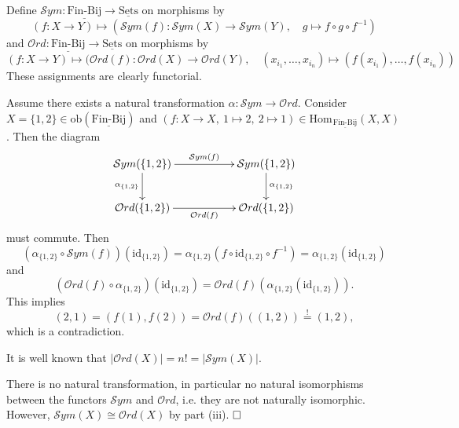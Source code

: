 \documentclass[11pt]{book}
\numberwithin{dummy}{section}
\theoremstyle{nonumberbreak}
\newenvironment{sol}[1][]{\ifthenelse{\equal{#1}{}}{\solution}{\solution[#1]}\rm}{\endsolution}
\newenvironment{prob}[1][]{\ifthenelse{\equal{#1}{}}{\problem}{\problem[#1]}\rm}{\endproblem}
\newcommand{\Hom}{\mathrm{Hom}\hspace{1pt}}
\newcommand{\sets}{\underline{\mathrm{Sets}}}
\newcommand{\finbij}{\underline{\mathrm{Fin}\textrm{-}\mathrm{Bij}}}
\newcommand{\la}{\longrightarrow}
\newcommand{\id}{\mathrm{id}}
\begin{document}
\begin{spacing}{1.4}
\begin{prob}
\begin{sol}
\begin{compactenum}
\item Define $\mathcal{S}ym: \finbij \la \sets$ on morphisms by
$$(f: X \la Y) \mapsto (\mathcal{S}ym(f): \mathcal{S}ym(X) \la \mathcal{S}ym(Y), \quad g \mapsto f \circ g \circ f^{-1})$$
and $\mathcal{O}rd: \finbij \la \sets$ on morphisms by 
$$(f: X \la Y) \mapsto (\mathcal{O}rd(f): \mathcal{O}rd(X) \la \mathcal{O}rd(Y), \quad (x_{i_1}, \ldots, x_{i_n}) \mapsto \left(f(x_{i_1}), \ldots, f(x_{i_n})\right) $$
These assignments are clearly functorial. 

\item Assume there exists a natural transformation $\alpha: \mathcal{S}ym \la \mathcal{O}rd$. Consider $X=\{1,2\} \in \mathrm{ob}(\finbij)$ and $(f: X \la X, \ 1 \mapsto 2, \ 2 \mapsto 1) \in \Hom_{\finbij}(X,X)$. Then the diagram
$$
\begin{xy}
\xymatrix{
\mathcal{S}ym(\{1,2\}) \ar[rr]^{\mathcal{S}ym(f)} \ar[d]_{\alpha_{\{1,2\}}} && \mathcal{S}ym(\{1,2\}) \ar[d]^{\alpha_{\{1,2\}}} \\ \mathcal{O}rd(\{1,2\}) \ar[rr]_{\mathcal{O}rd(f)} && \mathcal{O}rd(\{1,2\})
}
\end{xy}
$$
must commute. Then 
$$\left( \alpha_{\{1,2\}} \circ \mathcal{S}ym(f)\right)\left(\id_{\{1,2\}}\right) = \alpha_{\{1,2\}}\left( f \circ \id_{\{1,2\}} \circ f^{-1}\right) = \alpha_{\{1,2\}}\left(\id_{\{1,2\}}\right)$$
and 
$$\left( \mathcal{O}rd(f) \circ \alpha_{\{1,2\}} \right) \left(\id_{\{1,2\}}\right) = \mathcal{O}rd(f) \left( \alpha_{\{1,2\}}\left(\id_{\{1,2\}}\right)\right).$$
This implies 
$$(2,1) = (f(1), f(2)) = \mathcal{O}rd(f)\left((1,2)\right) \overset{!}{=} (1,2),$$
which is a contradiction.
\item It is well known that $\vert \mathcal{O}rd(X)\vert = n! = \vert \mathcal{S}ym(X)\vert$.
\item There is no natural transformation, in particular no natural isomorphisms between the functors $\mathcal{S}ym$ and $\mathcal{O}rd$, i.e. they are not naturally isomorphic. However, $\mathcal{S}ym(X) \cong \mathcal{O}rd(X)$ by part (iii). $\hfill \Box$
\end{compactenum}

\end{sol}

\end{prob}












\end{spacing}
\end{document}
